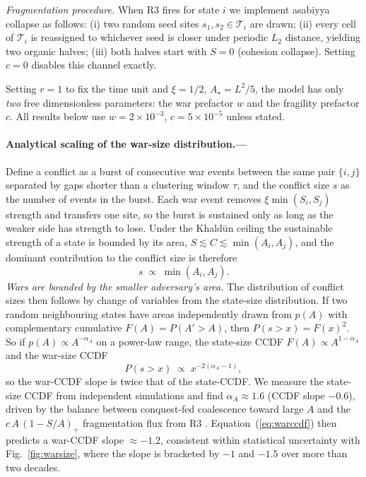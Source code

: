\documentclass[10pt,twocolumn]{article}
\begin{document}
\emph{Fragmentation procedure.} When R3 fires for state $i$ we
implement asabiyya collapse as follows: (i) two random seed sites
$s_1,s_2\in\mathcal{T}_i$ are drawn; (ii) every cell of $\mathcal{T}_i$
is reassigned to whichever seed is closer under periodic $L_2$ distance,
yielding two organic halves; (iii) both halves start with $S=0$
(cohesion collapse). Setting $c=0$ disables this channel exactly.

Setting $r=1$ to fix the time unit and $\xi=1/2$, $A_\star=L^2/5$,
the model has only \emph{two} free dimensionless parameters: the war
prefactor $w$ and the fragility prefactor $c$. All results below use
$w=2\!\times\!10^{-3}$, $c=5\!\times\!10^{-5}$ unless stated.

\paragraph*{Analytical scaling of the war-size distribution.---}
Define a conflict as a burst of consecutive war events between the
same pair $\{i,j\}$ separated by gaps shorter than a clustering
window $\tau$, and the conflict size $s$ as the number of events in
the burst. Each war event removes $\xi\min(S_i,S_j)$ strength and
transfers one site, so the burst is sustained only as long as the
weaker side has strength to lose. Under the Khald\=un ceiling the
sustainable strength of a state is bounded by its area, $S\!\lesssim\!
C\!\lesssim\!\min(A_i,A_j)$, and the dominant contribution to the
conflict size is therefore
\begin{equation}
s\;\propto\;\min(A_i,A_j).
\label{eq:smax}
\end{equation}
\emph{Wars are bounded by the smaller adversary's area.} The
distribution of conflict sizes then follows by change of variables
from the state-size distribution. If two random neighbouring states
have areas independently drawn from $p(A)$ with complementary
cumulative $F(A)=P(A'>A)$, then
$P(s>x)=F(x)^2$. So if $p(A)\propto A^{-\alpha_A}$ on a power-law
range, the state-size CCDF $F(A)\propto A^{1-\alpha_A}$ and the
war-size CCDF
\begin{equation}
P(s>x)\;\propto\;x^{-2(\alpha_A-1)},
\label{eq:warccdf}
\end{equation}
so the war-CCDF slope is twice that of the state-CCDF.
We measure the state-size CCDF from independent simulations and find
$\alpha_A\!\approx\!1.6$ (CCDF slope $-0.6$), driven by the balance
between conquest-fed coalescence toward large $A$ and the
$c\,A\,(1-S/A)_+$ fragmentation flux from R3
\cite{ZielingerFragm}. Equation~(\ref{eq:warccdf}) then predicts a
war-CCDF slope $\approx-1.2$, consistent within statistical
uncertainty with Fig.~\ref{fig:warsize}, where the slope is bracketed
by $-1$ and $-1.5$ over more than two decades.
\end{document}
